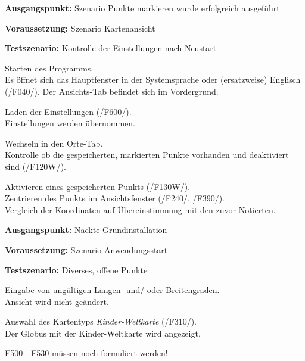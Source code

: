 \documentclass[10pt]{scrreprt}
\newcommand{\sfbf}[1]{\textbf{\sffamily #1}}
\newcommand{\ziel}[1]{{\fontsize{9.5}{11}\textsf{/#1/}}}
\newenvironment{details}[1][6pt]{%
  \parskip#1 \parindent6mm \raggedright%
  \def\item{\par\ignorespaces\hangindent=5mm \hangafter1}}{%
  \par\ignorespaces}
\begin{document}
\vspace{1.0cm}
\begin{details}[2pt]
\item \sfbf{Ausgangspunkt:} Szenario Punkte markieren wurde erfolgreich ausgeführt
\item \sfbf{Voraussetzung:} Szenario Kartenansicht
\item \sfbf{Testszenario:} Kontrolle der Einstellungen nach Neustart
\end{details}
\vspace{2mm}
\begin{enumerate}[leftmargin = 2.2cm, resume]
\item Starten des Programms.\\Es öffnet sich das Hauptfenster in der Systemsprache oder (ersatzweise) Englisch (\ziel{F040}). Der Ansichts-Tab befindet sich im Vordergrund.
\item Laden der Einstellungen (\ziel{F600}).\\Einstellungen werden übernommen.
\item Wechseln in den Orte-Tab.\\Kontrolle ob die gespeicherten, markierten Punkte vorhanden und deaktiviert sind (\ziel{F120W}).
\item Aktivieren eines gespeicherten Punkts (\ziel{F130W}).\\Zentrieren des Punkts im Ansichtsfenster (\ziel{F240}, \ziel{F390}).\\Vergleich der Koordinaten auf Übereinstimmung mit den zuvor Notierten.
\end{enumerate}


\vspace{1.0cm}
\begin{details}[2pt]
\item \sfbf{Ausgangspunkt:} Nackte Grundinstallation 
\item \sfbf{Voraussetzung:} Szenario Anwendungsstart
\item \sfbf{Testszenario:} Diverses, offene Punkte
\end{details}
\vspace{2mm}
\begin{enumerate}[leftmargin = 2.2cm, resume]
\item Eingabe von ungültigen Längen- und/ oder Breitengraden.\\ Ansicht wird nicht geändert.
\item Auswahl des Kartentyps \textit{Kinder-Weltkarte} (\ziel{F310}).\\Der Globus mit der Kinder-Weltkarte wird angezeigt.
\item F500 - F530 müssen noch formuliert werden!
\end{enumerate}
\end{document}
